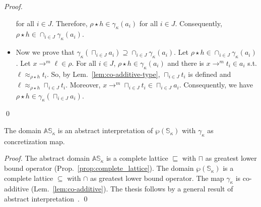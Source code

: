 \begin{proof}
\begin{itemize}
    for all $i\in J$. Therefore, $\rho\star h\in\gamma_\kappa(a_i)$
    for all $i\in J$. Consequently,
    $\rho\star h\in\cap_{i\in J}\gamma_\kappa(a_i)$.
    \item Now we prove that
    $\gamma_\kappa(\sqcap_{i\in J}a_i)\supseteq\cap_{i\in J}\gamma_\kappa(a_i)$.
    Let $\rho\star h\in\cap_{i\in J}\gamma_\kappa(a_i)$.
    Let $x\to^m\ell\in\rho$.
    For all $i\in J$, $\rho\star h\in\gamma_\kappa(a_i)$ and there
    is $x\to^m t_i\in a_i$ s.t. $\ell\approx_{\rho\star h}t_i$.
    So, by Lem.~\ref{lem:co-additive-type}, $\sqcap_{i\in J}t_i$ is defined
    and $\ell\approx_{\rho\star h}\sqcap_{i\in J}t_i$.
    Moreover, $x\to^m \sqcap_{i\in J}t_i \in \sqcap_{i\in J}a_i$.
    Consequently, we have $\rho\star h\in\gamma_\kappa(\sqcap_{i\in J}a_i)$.
  \end{itemize}
  \qed
\end{proof}

\begin{proposition}\label{prop:abstract_interpretation}
  The domain $\mathbb{AS}_\kappa$ is an abstract interpretation of $\wp(\mathbb{S}_\kappa)$
  with $\gamma_\kappa$ as concretization map.
\end{proposition}
\begin{proof}
  The abstract domain $\mathbb{AS}_\kappa$ is a complete lattice \wrt $\sqsubseteq$
  with $\sqcap$ as greatest lower bound operator (Prop.~\ref{prop:complete_lattice}).
  The domain $\wp(\mathbb{S}_\kappa)$ is a complete lattice \wrt $\subseteq$ with $\cap$ as
  greatest lower bound operator. The map $\gamma_\kappa$ is co-additive (Lem.~\ref{lem:co-additive}).
  The thesis follows by a general result of abstract interpretation~\cite{CousotC77}.
  \qed
\end{proof}

